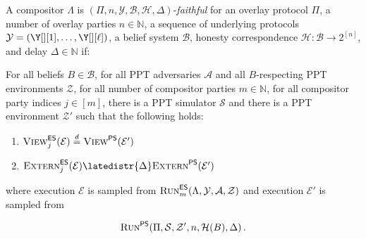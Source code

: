 \begin{definition}
  A compositor $\Lambda$
  is $(\Pi, n, \mathcal{Y}, \mathcal{B}, \mathcal{H}, \Delta)$-\emph{faithful}
  for an overlay protocol $\Pi$,
  a number of overlay parties $n \in \mathbb{N}$,
  a sequence of underlying protocols $\mathcal{Y} = (\Y[][1], \ldots, \Y[][\ell])$,
  a belief system $\mathcal{B}$,
  honesty correspondence $\mathcal{H}: \mathcal{B} \longrightarrow 2^{[n]}$,
  and delay $\Delta \in \mathbb{N}$ if:

  For all beliefs $B \in \mathcal{B}$,
  for all PPT adversaries $\mathcal{A}$ and all
  $B$-respecting PPT environments $\mathcal{Z}$,
  for all number of compositor parties $m \in \mathbb{N}$,
  for all compositor party indices $j \in [m]$,
  there is a PPT simulator $\mathcal{S}$ and there is a
  PPT environment $\mathcal{Z}'$ such that
  the following holds:

  \begin{enumerate}
    \item $\LCView_j(\mathcal{E}) \distreq \PEView(\mathcal{E}')$
    \item $\LCExtern_j(\mathcal{E}) \latedistr{\Delta} \PEExtern(\mathcal{E}')$
  \end{enumerate}

  where execution $\mathcal{E}$ is sampled from
  $\textsc{Run}^{\textsf{ES}}_m(\Lambda, \mathcal{Y}, \mathcal{A}, \mathcal{Z})$
  and execution $\mathcal{E}'$ is sampled from

  \[
  \textsc{Run}^{\textsf{PS}}(\Pi, \mathcal{S}, \mathcal{Z}', n, \mathcal{H}(B), \Delta)\,.
  \]
\end{definition}


